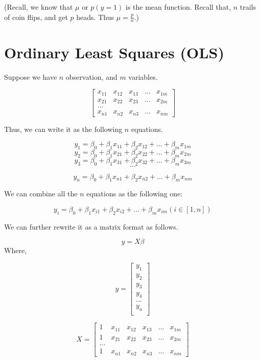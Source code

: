 \documentclass[]{book}
\begin{document}
(Recall, we know that \(\mu\) or \(p(y=1)\) is the mean function. Recall that, \(n\) trails of coin flips, and get \(p\) heads. Thus \(\mu = \frac{p}{n}\).)

\hypertarget{ordinary-least-squares-ols}{%
\chapter{Ordinary Least Squares (OLS)}\label{ordinary-least-squares-ols}}

Suppose we have \(n\) observation, and \(m\) variables.

\[\begin{bmatrix}
x_{11} & x_{12} & x_{13} & ... & x_{1m}\\
x_{21} & x_{22} & x_{23} & ... & x_{2m} \\
...\\
x_{n1} & x_{n2} & x_{n3} & ... & x_{nm}
\end{bmatrix}\]

Thus, we can write it as the following \(n\) equations.

\[y_1=\beta_0+\beta_1 x_{11}+\beta_2 x_{12}+...+ \beta_m x_{1m}\]
\[y_2=\beta_0+\beta_1 x_{21}+\beta_2 x_{22}+...+ \beta_m x_{2m}\]
\[y_3=\beta_0+\beta_1 x_{31}+\beta_2 x_{32}+...+ \beta_m x_{3m}\]
\[...\]

\[y_n=\beta_0+\beta_1 x_{n1}+\beta_2 x_{n2}+...+ \beta_m x_{nm}\]

We can combine all the \(n\) equations as the following one:

\[y_i=\beta_0+\beta_1 x_{i1}+\beta_2 x_{i2}+...+ \beta_m x_{im}  (i \in [1,n])\]

We can further rewrite it as a matrix format as follows.

\[y= X \beta\]
Where,

\[y = \begin{bmatrix}y_1 \\
y_2 \\
y_3 \\
y_4 \\
...\\
y_n \\
\end{bmatrix}\]

\[X=\begin{bmatrix}
1 & x_{11} & x_{12} & x_{13} & ... & x_{1m}\\
1 & x_{21} & x_{22} & x_{23} & ... & x_{2m} \\
...\\
1 & x_{n1} & x_{n2} & x_{n3} & ... & x_{nm}
\end{bmatrix}\]
\end{document}
